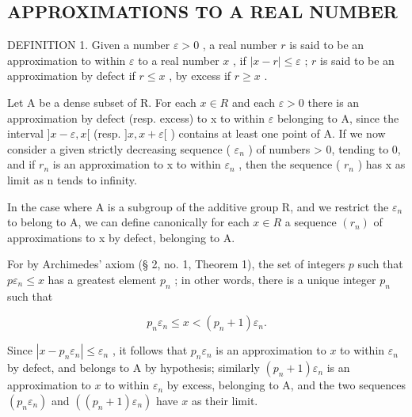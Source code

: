 \subsection{APPROXIMATIONS TO A REAL NUMBER}

DEFINITION 1. Given a number \(\varepsilon > 0\) , a real number \(r\) is said to be an approximation to within \(\varepsilon\) to a real number \(x\) , if \(|x - r| \leqslant \varepsilon\) ; \(r\) is said to be an approximation by defect if \(r \leqslant x\) , by excess if \(r \geqslant x\) .

Let A be a dense subset of R. For each \(x \in R\) and each \(\varepsilon > 0\) there is an approximation by defect (resp. excess) to x to within \(\varepsilon\) belonging to A, since the interval \(]x - \varepsilon, x[\) (resp. \(]x, x + \varepsilon[\) ) contains at least one point of A. If we now consider a given strictly decreasing sequence ( \(\varepsilon_{n}\) ) of numbers \textgreater{} 0, tending to 0, and if \(r_{n}\) is an approximation to x to within \(\varepsilon_{n}\) , then the sequence ( \(r_{n}\) ) has x as limit as n tends to infinity.

In the case where A is a subgroup of the additive group R, and we restrict the \(\varepsilon_{n}\) to belong to A, we can define canonically for each \(x \in R\) a sequence \((r_{n})\) of approximations to x by defect, belonging to A.

For by Archimedes' axiom (§ 2, no. 1, Theorem 1), the set of integers \(p\) such that \(p\varepsilon_n \leqslant x\) has a greatest element \(p_n\) ; in other words, there is a unique integer \(p_n\) such that

\[
p _ {n} \varepsilon_ {n} \leqslant x <   (p _ {n} + 1) \varepsilon_ {n}.\tag{1}
\]

Since \(|x - p_n\varepsilon_n| \leqslant \varepsilon_n\) , it follows that \(p_n\varepsilon_n\) is an approximation to \(x\) to within \(\varepsilon_n\) by defect, and belongs to A by hypothesis; similarly \((p_n + 1)\varepsilon_n\) is an approximation to \(x\) to within \(\varepsilon_n\) by excess, belonging to A, and the two sequences \((p_n\varepsilon_n)\) and \(((p_n + 1)\varepsilon_n)\) have \(x\) as their limit.

